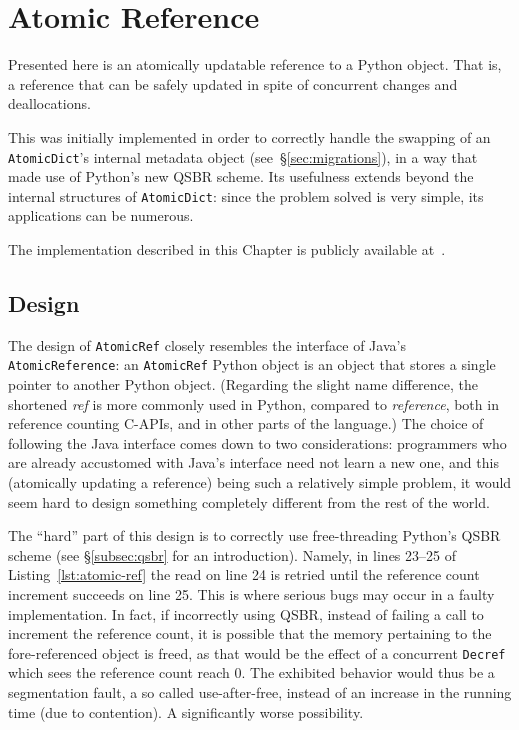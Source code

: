\chapter{Atomic Reference}\label{ch:atomic-reference}

Presented here is an atomically updatable reference to a Python object.
That is, a reference that can be safely updated in spite of concurrent changes and deallocations.

This was initially implemented in order to correctly handle the swapping of an \texttt{AtomicDict}'s internal metadata object (see~\S\ref{sec:migrations}), in a way that made use of Python's new QSBR scheme.
Its usefulness extends beyond the internal structures of \texttt{AtomicDict}: since the problem solved is very simple, its applications can be numerous.

The implementation described in this Chapter is publicly available at~\cite[src/cereggii/atomic\_ref.c]{cereggii}.


\section{Design}\label{sec:design}

The design of \texttt{AtomicRef} closely resembles the interface of Java's \texttt{AtomicReference}: an \texttt{AtomicRef} Python object is an object that stores a single pointer to another Python object.
(Regarding the slight name difference, the shortened \emph{ref} is more commonly used in Python, compared to \emph{reference}, both in reference counting C-APIs, and in other parts of the language.)
The choice of following the Java interface comes down to two considerations: programmers who are already accustomed with Java's interface need not learn a new one, and this (atomically updating a reference) being such a relatively simple problem, it would seem hard to design something completely different from the rest of the world.

The ``hard'' part of this design is to correctly use free-threading Python's QSBR scheme (see \S\ref{subsec:qsbr} for an introduction).
Namely, in lines 23--25 of Listing~\ref{lst:atomic-ref} the read on line 24 is retried until the reference count increment succeeds on line 25.
This is where serious bugs may occur in a faulty implementation.
In fact, if incorrectly using QSBR, instead of failing a call to increment the reference count, it is possible that the memory pertaining to the fore-referenced object is freed, as that would be the effect of a concurrent \texttt{Decref} which sees the reference count reach 0.
The exhibited behavior would thus be a segmentation fault, a so called use-after-free, instead of an increase in the running time (due to contention).
A significantly worse possibility.

